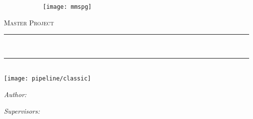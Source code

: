 
\begin{titlepage}
    \begin{center}
        \vspace*{.1\textheight}
        \begin{figure}[h]
            \begin{subfigure}{.5\textwidth}
            \centering
            \def\svgwidth{0.8\textwidth}
            
            \end{subfigure}
            \begin{subfigure}{.5\textwidth}
            \centering
            \texttt{[image: mmspg]}
            \end{subfigure}
        \end{figure}
        \vspace*{1.5cm}
        \textsc{\Large Master Project}\\[0.5cm] %

        \rule{.9\linewidth}{.6pt} \\[0.5cm]
        {\huge \bfseries \ttitle\par}\vspace{0.4cm} %
        \rule{.9\linewidth}{.6pt} \\[0.5cm]
        \vfill
        {\centering \texttt{[image: pipeline/classic]}}
        \vfill
        \begin{minipage}[t]{0.4\textwidth}
            \begin{flushleft} \large
                \emph{Author:}\\
                \authorname
            \end{flushleft}
        \end{minipage}
        \begin{minipage}[t]{0.4\textwidth}
            \begin{flushright} \large
                \emph{Supervisors:} \\
                \supname %
            \end{flushright}
        \end{minipage}\\[3cm]
    \end{center}
\end{titlepage}
